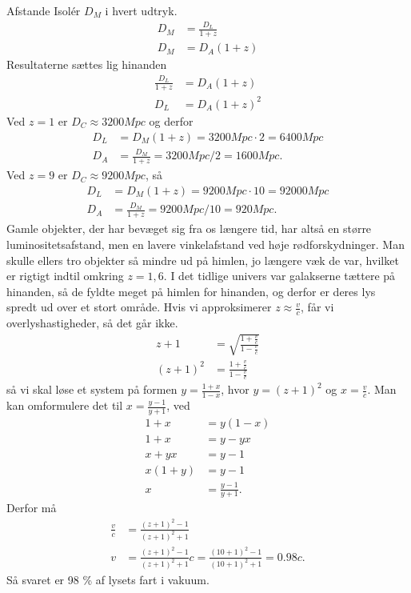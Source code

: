 \begin{opgave}{Afstande}
	\opg Isolér $D_M$ i hvert udtryk.
	\begin{align}
		D_M &= \frac{D_L}{1+z}\\
		D_M &= D_A(1+z)
	\end{align}
	Resultaterne sættes lig hinanden
		\begin{align}
		\frac{D_L}{1+z} &= D_A(1+z)\\
		D_L &= D_A (1+z)^2
		\end{align}
	\opg Ved $z=1$ er $D_C\approx3200 Mpc$ og derfor
	\begin{align}
		D_L &= D_M(1+z)= 3200 Mpc \cdot 2 = 6400 Mpc\\
		D_A &= \frac{D_M}{1+z}= 3200 Mpc/ 2 = 1600 Mpc.
	\end{align}
	Ved $z=9$ er $D_C\approx9200 Mpc$, så
	\begin{align}
		D_L &= D_M(1+z)= 9200 Mpc \cdot 10 = 92000 Mpc\\
		D_A &= \frac{D_M}{1+z}= 9200 Mpc/ 10 = 920 Mpc.
	\end{align}
	Gamle objekter, der har bevæget sig fra os længere tid, har altså en større luminositetsafstand, men en lavere vinkelafstand ved høje rødforskydninger. Man skulle ellers tro objekter så mindre ud på himlen, jo længere væk de var, hvilket er rigtigt indtil omkring $z=1,6$. I det tidlige univers var galakserne tættere på hinanden, så de fyldte meget på himlen for hinanden, og derfor er deres lys spredt ud over et stort område.
	\opg
	Hvis vi approksimerer $z\approx\frac{v}{c}$, får vi overlyshastigheder, så det går ikke.
	\begin{align}
    	z+1&=\sqrt{\frac{1+\frac{v}{c}}{1-\frac{v}{c}}}\\
    	(z+1)^2&=\frac{1+\frac{v}{c}}{1-\frac{v}{c}}
	\end{align}
	så vi skal løse et system på formen $y=\frac{1+x}{1-x}$, hvor $y=(z+1)^2$ og $x=\frac{v}{c}$. Man kan omformulere det til $x=\frac{y-1}{y+1}$, ved
	\begin{align}
	    1+x &= y(1-x)\\
	    1+x &= y-yx \\
	    x+yx &= y-1 \\
	    x(1+y) &= y-1 \\
	    x &= \frac{y-1}{y+1}.
	\end{align}
    Derfor må
	\begin{align}
    	\frac{v}{c}&=\frac{(z+1)^2-1}{(z+1)^2+1}\\
    	v&=\frac{(z+1)^2-1}{(z+1)^2+1} c = \frac{(10+1)^2-1}{(10+1)^2+1} = 0.98 c. %
	\end{align}
	Så svaret er 98 \% af lysets fart i vakuum.
\end{opgave}


